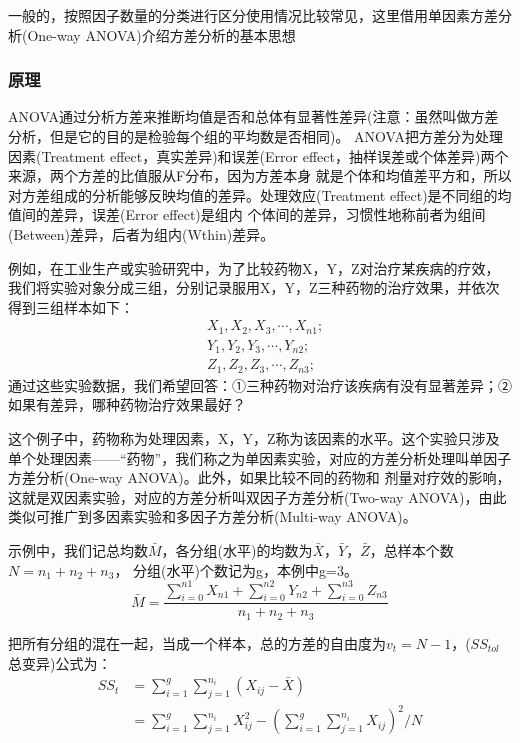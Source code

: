 \documentclass[
]{article}
\begin{document}
一般的，按照因子数量的分类进行区分使用情况比较常见，这里借用单因素方差分析(One-way ANOVA)介绍方差分析的基本思想

\hypertarget{ux539fux7406}{%
\subsubsection{原理}\label{ux539fux7406}}

ANOVA通过分析方差来推断均值是否和总体有显著性差异(注意：虽然叫做方差分析，但是它的目的是检验每个组的平均数是否相同)。
ANOVA把方差分为处理因素(Treatment effect，真实差异)和误差(Error effect，抽样误差或个体差异)两个来源，两个方差的比值服从F分布，因为方差本身
就是个体和均值差平方和，所以对方差组成的分析能够反映均值的差异。处理效应(Treatment effect)是不同组的均值间的差异，误差(Error effect)是组内
个体间的差异，习惯性地称前者为组间(Between)差异，后者为组内(Wthin)差异。

例如，在工业生产或实验研究中，为了比较药物X，Y，Z对治疗某疾病的疗效，我们将实验对象分成三组，分别记录服用X，Y，Z三种药物的治疗效果，并依次得到三组样本如下：
\[\begin{aligned}
& X_1,X_2,X_3,\cdots,X_{n1};\\
& Y_1,Y_2,Y_3,\cdots,Y_{n2};\\
& Z_1,Z_2,Z_3,\cdots,Z_{n3};
\end{aligned}\]
通过这些实验数据，我们希望回答：①三种药物对治疗该疾病有没有显著差异；②如果有差异，哪种药物治疗效果最好？

这个例子中，药物称为处理因素，X，Y，Z称为该因素的水平。这个实验只涉及单个处理因素------``药物''，我们称之为单因素实验，对应的方差分析处理叫单因子方差分析(One-way ANOVA)。此外，如果比较不同的药物和
剂量对疗效的影响，这就是双因素实验，对应的方差分析叫双因子方差分析(Two-way ANOVA)，由此类似可推广到多因素实验和多因子方差分析(Multi-way ANOVA)。

示例中，我们记总均数\(\bar{M}\)，各分组(水平)的均数为\(\bar{X}\)，\(\bar{Y}\)，\(\bar{Z}\)，总样本个数\(N=n_1+n_2+n_3\)，
分组(水平)个数记为g，本例中g=3。
\[\bar{M}=\frac{\sum_{i=0}^{n1}X_{n1}+\sum_{i=0}^{n2}Y_{n2}+\sum_{i=0}^{n3}Z_{n3}}{n_1+n_2+n_3}\]

把所有分组的混在一起，当成一个样本，总的方差的自由度为\(v_t=N-1\)，(\(SS_{tol}\)总变异)公式为：
\[\begin{aligned}
SS_{t} &= \sum_{i=1}^g\sum_{j=1}^{n_i}(X_{ij}-\bar{X})\\
 &= \sum_{i=1}^g\sum_{j=1}^{n_i}X_{ij}^2-(\sum_{i=1}^g\sum_{j=1}^{n_i}X_{ij})^2/N
\end{aligned}\]
\end{document}
